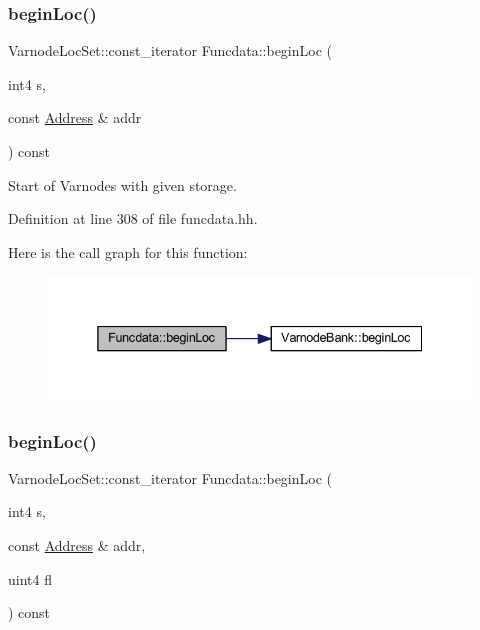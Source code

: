 \subsubsection{\texorpdfstring{beginLoc()}{beginLoc()}\hspace{0.1cm}{\footnotesize\ttfamily [4/6]}}
{\footnotesize\ttfamily Varnode\+Loc\+Set\+::const\+\_\+iterator Funcdata\+::begin\+Loc (\begin{DoxyParamCaption}\item[{int4}]{s,  }\item[{const \mbox{\hyperlink{class_address}{Address}} \&}]{addr }\end{DoxyParamCaption}) const\hspace{0.3cm}{\ttfamily [inline]}}



Start of Varnodes with given storage. 



Definition at line 308 of file funcdata.\+hh.

Here is the call graph for this function\+:
\nopagebreak
\begin{figure}[H]
\begin{center}
\leavevmode
\includegraphics[width=338pt]{class_funcdata_ad2b7ea0975c8f7022f14158d3bb9e9d5_cgraph}
\end{center}
\end{figure}
\mbox{\label{class_funcdata_afc1213896328c86680dc05c9c5daa7c5}} 
\subsubsection{\texorpdfstring{beginLoc()}{beginLoc()}\hspace{0.1cm}{\footnotesize\ttfamily [5/6]}}
{\footnotesize\ttfamily Varnode\+Loc\+Set\+::const\+\_\+iterator Funcdata\+::begin\+Loc (\begin{DoxyParamCaption}\item[{int4}]{s,  }\item[{const \mbox{\hyperlink{class_address}{Address}} \&}]{addr,  }\item[{uint4}]{fl }\end{DoxyParamCaption}) const\hspace{0.3cm}{\ttfamily [inline]}}



